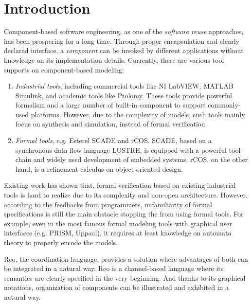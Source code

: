 \section{Introduction}
\label{sec:introduction}

Component-based software engineering, as one of the \emph{software reuse} approaches, has been prospering for a long time. Through proper encapsulation and clearly declared interface, a \emph{component} can be invoked by different applications without knowledge on its implementation details.
Currently, there are various tool supports on component-based modeling:
\begin{enumerate}
\item \emph{Industrial tools}, including commercial tools like NI LabVIEW\cite{labview}, MATLAB Simulink\cite{hahn2016essentialsimulink}, and academic tools like Ptolomy\cite{KimPtolomy2017}. These tools  provide powerful formalism and a large number of built-in component to support commonly-used platforms. However, due to the complexity of models, such tools mainly focus on synthesis and simulation, instead of formal verification.

\item \emph{Formal tools}, e.g. Esterel SCADE\cite{AbdullaISoLA2006} and rCOS\cite{LiuFsenRcos2010}. SCADE, based on a synchronous data flow language LUSTRE, is equipped with a powerful tool-chain and widely used development of embedded systems. rCOS, on the other hand, is a refinement calculus on object-oriented design.
\end{enumerate}

Existing work\cite{ZouSimulinkHcsp2013} has shown that, formal verification based on existing industrial tools is hard to realize due to its complexity and non-open architecture. However, according to the feedbacks from programmers, unfamiliarity of formal specifications is still the main obstacle stopping the from using formal tools. For example, even in the most famous formal modeling tools with graphical user interfaces (e.g. PRISM\cite{KwiatkowskaCavPrism2011}, Uppaal\cite{AmnellMovepUppaal2001}), it requires at least knowledge on automata theory to properly encode the models.

Reo\cite{ArbabMscsReo2004}, the coordination language, provides a solution where advantages of both can be integrated in a natural way. Reo is a channel-based language where its semantics are clearly specified in the very beginning. And thanks to its graphical notations, organization of components can be illustrated and exhibited in a natural way.

